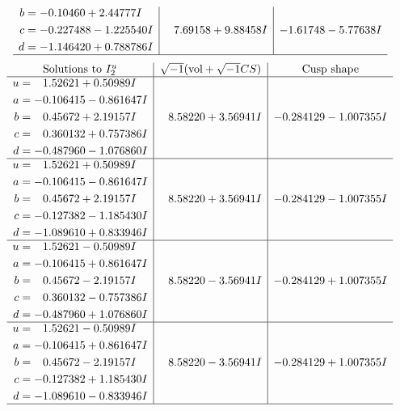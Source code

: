 \documentclass[1p]{elsarticle_modified}
\theoremstyle{definition}
\newcommand{\I}{\sqrt{-1}}
\begin{document}
$$\begin{array}{c|c|c}
\begin{aligned}
b &= -0.10460 + 2.44777 I \\
c &= -0.227488 - 1.225540 I \\
d &= -1.146420 + 0.788786 I\end{aligned}
 & \phantom{-}7.69158 + 9.88458 I & -1.61748 - 5.77638 I\\
 \hline 
 \end{array}$$\newpage$$\begin{array}{c|c|c}  
\text{Solutions to }I^u_{2}& \I (\text{vol} + \sqrt{-1}CS) & \text{Cusp shape}\\
 \hline 
\begin{aligned}
u &= \phantom{-}1.52621 + 0.50989 I \\
a &= -0.106415 - 0.861647 I \\
b &= \phantom{-}0.45672 + 2.19157 I \\
c &= \phantom{-}0.360132 + 0.757386 I \\
d &= -0.487960 - 1.076860 I\end{aligned}
 & \phantom{-}8.58220 + 3.56941 I & -0.284129 - 1.007355 I \\ \hline\begin{aligned}
u &= \phantom{-}1.52621 + 0.50989 I \\
a &= -0.106415 - 0.861647 I \\
b &= \phantom{-}0.45672 + 2.19157 I \\
c &= -0.127382 - 1.185430 I \\
d &= -1.089610 + 0.833946 I\end{aligned}
 & \phantom{-}8.58220 + 3.56941 I & -0.284129 - 1.007355 I \\ \hline\begin{aligned}
u &= \phantom{-}1.52621 - 0.50989 I \\
a &= -0.106415 + 0.861647 I \\
b &= \phantom{-}0.45672 - 2.19157 I \\
c &= \phantom{-}0.360132 - 0.757386 I \\
d &= -0.487960 + 1.076860 I\end{aligned}
 & \phantom{-}8.58220 - 3.56941 I & -0.284129 + 1.007355 I \\ \hline\begin{aligned}
u &= \phantom{-}1.52621 - 0.50989 I \\
a &= -0.106415 + 0.861647 I \\
b &= \phantom{-}0.45672 - 2.19157 I \\
c &= -0.127382 + 1.185430 I \\
d &= -1.089610 - 0.833946 I\end{aligned}
 & \phantom{-}8.58220 - 3.56941 I & -0.284129 + 1.007355 I\\
 \hline 
 \end{array}$$\newpage\newpage\renewcommand{\arraystretch}{1}
\end{document}
